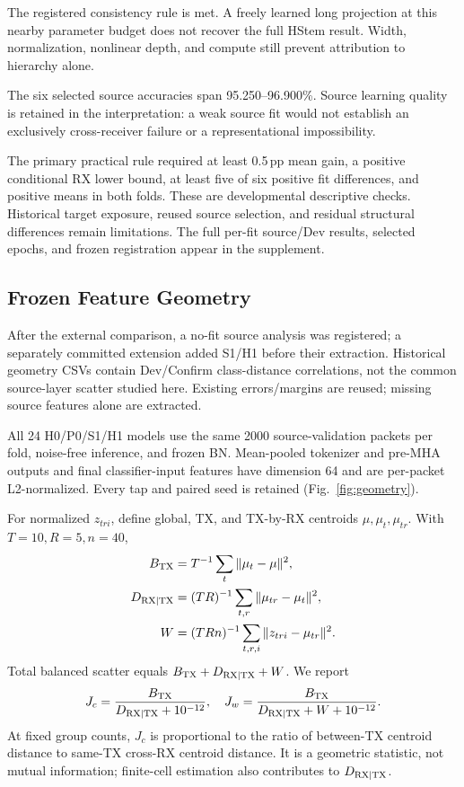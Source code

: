 \documentclass[journal]{IEEEtran}
\begin{document}
The registered consistency rule is met. A freely learned long projection at this nearby parameter budget does not recover the full HStem result. Width, normalization, nonlinear depth, and compute still prevent attribution to hierarchy alone.

The six selected source accuracies span 95.250--96.900\%. Source learning quality is retained in the interpretation: a weak source fit would not establish an exclusively cross-receiver failure or a representational impossibility.

The primary practical rule required at least 0.5\,pp mean gain, a positive conditional RX lower bound, at least five of six positive fit differences, and positive means in both folds. These are developmental descriptive checks. Historical target exposure, reused source selection, and residual structural differences remain limitations. The full per-fit source/Dev results, selected epochs, and frozen registration appear in the supplement.

\subsection{Frozen Feature Geometry}
After the external comparison, a no-fit source analysis was registered; a separately committed extension added S1/H1 before their extraction. Historical geometry CSVs contain Dev/Confirm class-distance correlations, not the common source-layer scatter studied here. Existing errors/margins are reused; missing source features alone are extracted.

All 24 H0/P0/S1/H1 models use the same 2000 source-validation packets per fold, noise-free inference, and frozen BN. Mean-pooled tokenizer and pre-MHA outputs and final classifier-input features have dimension 64 and are per-packet L2-normalized. Every tap and paired seed is retained (Fig.~\ref{fig:geometry}).

For normalized $z_{tri}$, define global, TX, and TX-by-RX centroids $\mu,\mu_t,\mu_{tr}$. With $T=10,R=5,n=40$,
\begin{align}
 B_{\rm TX}&=T^{-1}\sum_t\|\mu_t-\mu\|^2,\\
 D_{\rm RX|TX}&=(TR)^{-1}\sum_{t,r}\|\mu_{tr}-\mu_t\|^2,\\
 W&=(TRn)^{-1}\sum_{t,r,i}\|z_{tri}-\mu_{tr}\|^2.
\end{align}
Total balanced scatter equals $B_{\rm TX}+D_{\rm RX|TX}+W$. We report
\begin{equation}
 J_c=\frac{B_{\rm TX}}{D_{\rm RX|TX}+10^{-12}},\quad
 J_w=\frac{B_{\rm TX}}{D_{\rm RX|TX}+W+10^{-12}}.
\end{equation}
At fixed group counts, $J_c$ is proportional to the ratio of between-TX centroid distance to same-TX cross-RX centroid distance. It is a geometric statistic, not mutual information; finite-cell estimation also contributes to $D_{\rm RX|TX}$.
\end{document}

